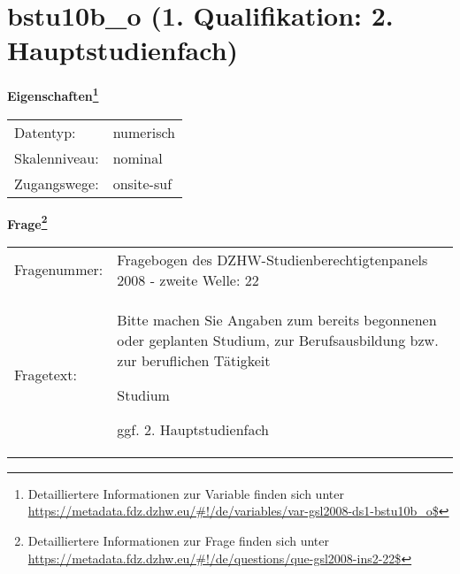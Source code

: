 
    \setcounter{footnote}{0}

    \vspace*{-1.8cm}
	\section{bstu10b\_o (1. Qualifikation: 2. Hauptstudienfach)}
	\label{section:bstu10b_o}



    \vspace*{0.5cm}
    \noindent\textbf{Eigenschaften\footnote{Detailliertere Informationen zur Variable finden sich unter
		\url{https://metadata.fdz.dzhw.eu/\#!/de/variables/var-gsl2008-ds1-bstu10b_o$}}}\\
	\begin{tabularx}{\hsize}{@{}lX}
	Datentyp: & numerisch \\
	Skalenniveau: & nominal \\
	Zugangswege: &
	  onsite-suf
 \\
    \end{tabularx}



				\vspace*{0.5cm}
                \noindent\textbf{Frage\footnote{Detailliertere Informationen zur Frage finden sich unter
		              \url{https://metadata.fdz.dzhw.eu/\#!/de/questions/que-gsl2008-ins2-22$}}}\\
				\begin{tabularx}{\hsize}{@{}lX}
					Fragenummer: &
					  Fragebogen des DZHW-Studienberechtigtenpanels 2008 - zweite Welle:
					  22
 \\
					Fragetext: & Bitte machen Sie Angaben zum bereits begonnenen oder geplanten Studium, zur Berufsausbildung bzw. zur beruflichen Tätigkeit\par  Studium\par  ggf. 2. Hauptstudienfach \\
				\end{tabularx}





